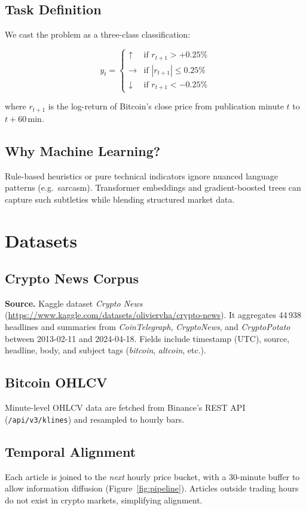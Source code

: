 \documentclass[12pt,a4paper]{article}
\begin{document}
\subsection{Task Definition}
We cast the problem as a three-class classification:

\[
y_t=\begin{cases}
\uparrow & \text{if } r_{t+1} > +0.25\% \\
\rightarrow & \text{if } |r_{t+1}| \le 0.25\% \\
\downarrow & \text{if } r_{t+1} < -0.25\%
\end{cases}
\]

where \(r_{t+1}\) is the log-return of Bitcoin’s close price from
publication minute \(t\) to \(t+60\mathrm{\,min}\).

\subsection{Why Machine Learning?}
Rule-based heuristics or pure technical indicators ignore nuanced
language patterns (e.g.\ sarcasm).  Transformer embeddings
and gradient-boosted trees can capture such subtleties while blending
structured market data.

\section{Datasets}
\subsection{Crypto News Corpus}
\textbf{Source.} Kaggle dataset \emph{Crypto News}
(\url{https://www.kaggle.com/datasets/oliviervha/crypto-news}).  
It aggregates 44\,938 headlines and summaries from
\emph{CoinTelegraph}, \emph{CryptoNews}, and \emph{CryptoPotato}
between 2013-02-11 and 2024-04-18.  
Fields include timestamp (UTC), source, headline, body, and
subject tags (\textit{bitcoin}, \textit{altcoin}, etc.).

\subsection{Bitcoin OHLCV}
Minute-level OHLCV data are fetched from Binance’s REST API
(\texttt{/api/v3/klines}) and resampled to hourly bars.

\subsection{Temporal Alignment}
Each article is joined to the \emph{next} hourly price bucket,
with a 30-minute buffer to allow information diffusion
(Figure~\ref{fig:pipeline}).  Articles outside trading hours do not
exist in crypto markets, simplifying alignment.
\end{document}
